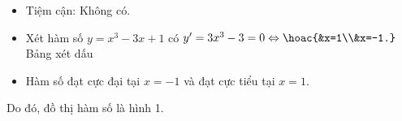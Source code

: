 \begin{ex}
{\begin{itemchoice}
\begin{itemize}
				\item Tiệm cận: Không có.
				\item Xét hàm số $y=x^3-3x+1$ có $y'=3x^3-3=0\Leftrightarrow \hoac{&x=1\\&x=-1.}$\\
				Bảng xét dấu
				\begin{center}
				\end{center}
				\item Hàm số đạt cực đại tại $x=-1$ và đạt cực tiểu tại $x=1$.
			\end{itemize}
			Do đó, đồ thị hàm số là hình 1.
	\end{itemchoice}}
\end{ex}


